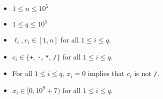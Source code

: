 \begin{itemize}
\tightlist
\item $1 \le n \le 10^5$
\item $1 \le q \le 10^5$
\item $\ell_i, r_i \in [1, n]$ for all $1\le i \le q$.
\item $c_i \in\{$\verb-+-, \verb+-+, \verb+*+, \verb+/+$\}$ 
      for all $1\le i \le q$.
\item For all $1\le i \le q$, $x_i = 0$ implies that $c_i$ is not \verb+/+.
\item $x_i \in [0, 10^9+7)$ for all $1\le i \le q$.
\end{itemize}
\newpage

